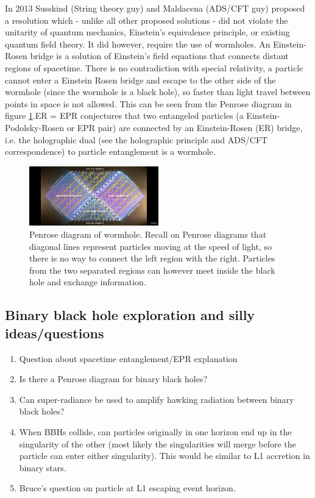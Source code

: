 \documentclass{article}
\begin{document}
In 2013 Susskind (String theory guy) and Maldacena (ADS/CFT guy) proposed a resolution which - unlike all other proposed solutions - did not violate the unitarity of quantum mechanics, Einstein's equivalence principle, or existing quantum field theory. It did however, require the use of wormholes. An Einstein-Rosen bridge is a solution of Einstein's field equations that connects distant regions of spacetime. There is no contradiction with special relativity, a particle cannot enter a Einstein Rosen bridge and escape to the other side of the wormhole (since the wormhole is a black hole), so faster than light travel between points in space is not allowed. This can be seen from the Penrose diagram in figure \ref{fig:womhole penrose diagram}.ER = EPR conjectures that two entangeled particles (a Einstein-Podolsky-Rosen or EPR pair) are connected by an Einstein-Rosen (ER) bridge, i.e. the holographic dual (see the holographic principle and ADS/CFT correspondence) to particle entanglement is a wormhole.

\begin{figure}
    \centering
    \includegraphics[width=0.5\textwidth]{images/8f24704956231dec3a4e849f60a54687.jpg}
    \caption{Penrose diagram of wormhole. Recall on Penrose diagrams that diagonal lines represent particles moving at the speed of light, so there is no way to connect the left region with the right. Particles from the two separated regions can however meet inside the black hole and exchange information.}
    \label{fig:womhole penrose diagram}
\end{figure}

\subsection{Binary black hole exploration and silly ideas/questions}

\begin{enumerate}
    \item Question about spacetime entanglement/EPR explanation
    \item Is there a Penrose diagram for binary black holes?
    \item Can super-radiance be used to amplify hawking radiation between binary black holes?
    \item When BBHs collide, can particles originally in one horizon end up in the singularity of the other (most likely the singularities will merge before the particle can enter either singularity). This would be similar to L1 accretion in binary stars.
    \item Bruce's question on particle at L1 escaping event horizon.
\end{enumerate}


\printbibliography
\end{document}
